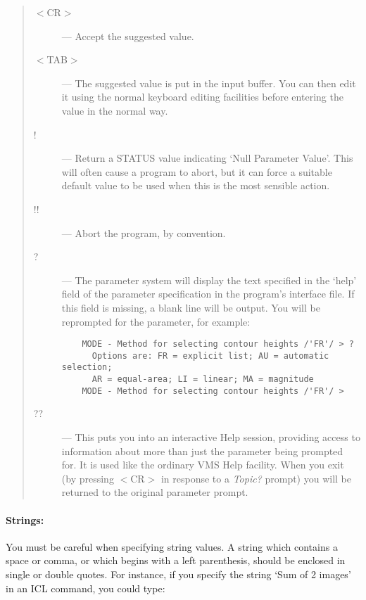 \begin{quote}
\begin{description}
\item [$<$CR$>$] ---
 Accept the suggested value.
\item [$<$TAB$>$] ---
 The suggested value is put in the input buffer.
 You can then edit it using the normal keyboard editing facilities before
 entering the value in the normal way.
\item [!] ---
 Return a STATUS value indicating `Null Parameter Value'.
 This will often cause a program to abort, but it can  force a suitable
 default value to be used when this is the most sensible action.
\item [!!] ---
 Abort the program, by convention.
\item [?] ---
 The parameter system will display the text specified in the `help' field of
 the parameter specification in the program's interface file.
 If this field is missing, a blank line will be output.
 You will be reprompted for the parameter, for example:

\begin{small}
\begin{verbatim}
    MODE - Method for selecting contour heights /'FR'/ > ?
      Options are: FR = explicit list; AU = automatic selection;
      AR = equal-area; LI = linear; MA = magnitude
    MODE - Method for selecting contour heights /'FR'/ >
\end{verbatim}
\end{small}

\item [??] ---
 This puts you into an interactive Help session, providing access to
 information about more than just the parameter being prompted for.
 It is used like the ordinary VMS Help facility.
 When you exit (by pressing $<$CR$>$ in response to a {\em Topic?} prompt) you
 will be returned to the original parameter prompt.
\end{description}
\end{quote}

\paragraph{Strings:}\hfill

You must be careful when specifying string values.
A string which contains a space or comma, or which begins with a left
parenthesis, should be enclosed in single or double quotes.
For instance, if you specify the string `Sum of 2 images' in an ICL command,
you could type:

